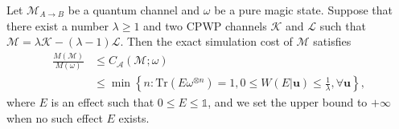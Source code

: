 \documentclass[10pt,a4paper]{amsart}
\begin{document}
\begin{theorem}\label{theorem 2}
	Let $\mathcal{M}_{A\rightarrow B}$ be a quantum channel and $\omega$ be a pure magic state. 
	Suppose that there exist a number $\lambda \geqslant 1$ and two CPWP channels $\mathcal{K}$ and $\mathcal{L}$ such that $\mathcal{M} = \lambda \mathcal{K} - (\lambda-1)\mathcal{L}$. 
	Then the exact simulation cost of $\mathcal{M}$ satisfies
	\begin{equation}
		\begin{aligned}
			\frac{M(\mathcal{M})}{M(\omega)} &\leqslant C_{\mathcal{A}}(\mathcal{M};\omega) \\ &\leqslant \min\left\{n:\mathrm{Tr}(E\omega^{\otimes n})=1,0\leqslant W(E|\mathbf{u}) \leqslant \frac{1}{\lambda},  \forall\mathbf{u}\right\},
		\end{aligned}
	\end{equation}
	where $E$ is an effect such that $0 \leqslant E \leqslant \mathds{1}$, and we set the upper bound to $+\infty$ when no such effect $E$ exists.
	
\end{theorem}
\end{document}
